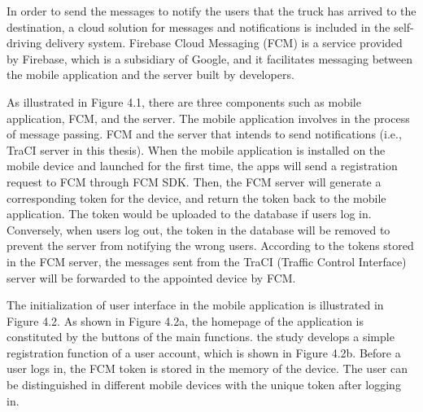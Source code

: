 \documentclass[12pt]{ksthesis}
\begin{document}
\begin{thesis}
{In order to send the messages to notify the users that the truck has arrived to the destination, a cloud solution for messages and notifications is included in the self-driving delivery system. Firebase Cloud Messaging (FCM) is a service provided by Firebase, which is a subsidiary of Google, and it facilitates messaging between the mobile application and the server built by developers. 

As illustrated in Figure 4.1, there are three components such as mobile application, FCM, and the server. The mobile application involves in the process of message passing.
FCM and the server that intends to send notifications (i.e., TraCI server in this thesis). 
When the mobile application is installed on the mobile device and launched for the first time, the apps will send a registration request to FCM through FCM SDK. Then, the FCM server will generate a corresponding token for the device, and return the token back to the mobile application. The token would be uploaded to the database if users log in. Conversely, when users log out, the token in the database will be removed to prevent the server from notifying the wrong users. According to the tokens stored in the FCM server, the messages sent from the TraCI (Traffic Control Interface) server will be forwarded to the appointed device by FCM.


The initialization of user interface in the mobile application is illustrated in Figure 4.2. As shown in Figure 4.2a, the homepage of the application is constituted by the buttons of the main functions. the study develops a simple registration function of a user account, which is shown in Figure 4.2b. 
Before a user logs in, the FCM token is stored in the memory of the device. The user can be distinguished in different mobile devices with the unique token after logging in.
 




}
\end{thesis}
\end{document}
